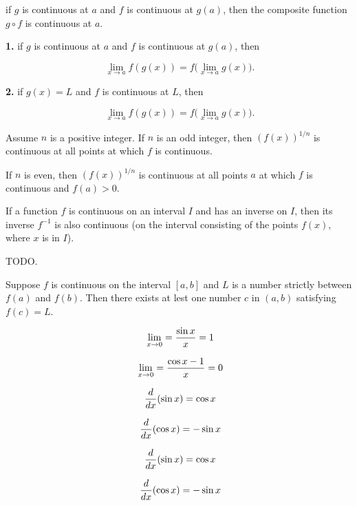 \endthm

if $g$ is continuous at $a$ and $f$ is continuous at $g(a)$,
then the composite function $g \circ f$ is continuous at $a$.
\endthm

\par {\bf 1.} if $g$ is continuous at $a$ and $f$ is continuous
at $g(a)$, then

$$\
\lim_{x \to a} f(g(x)) = f\big(\lim_{x \to a} g(x)\big).
$$

\par {\bf 2.} if $g(x) = L$ and $f$ is continuous at $L$,
then

$$\
\lim_{x \to a} f(g(x)) = f\big(\lim_{x \to a} g(x)\big).
$$

\endthm

Assume $n$ is a positive integer. If $n$ is an odd integer,
then $(f(x))^{1/n}$ is continuous at all points at which
$f$ is continuous.
\par
If $n$ is even, then $(f(x))^{1/n}$ is continuous at all points
$a$ at which $f$ is continuous and $f(a) > 0$.
\endthm

If a function $f$ is continuous on an interval $I$ and
has an inverse on $I$, then its inverse $f^{-1}$ is also
continuous (on the interval consisting of the points
$f(x)$, where $x$ is in $I$).
\endthm

TODO.
\endthm

Suppose $f$ is continuous on the interval $[a, b]$ and $L$
is a number strictly between $f(a)$ and $f(b)$. Then there
exists at lest one number $c$ in $(a, b)$ satisfying $f(c) = L$.
\endthm

$$\
\lim_{x \to 0} = {\sin x \over x} = 1
$$

$$\
\lim_{x \to 0} = {\cos x - 1 \over x} = 0
$$
\endthm

$$\
{d \over dx}(\sin x) = \cos x
$$

$$\
{d \over dx}(\cos x) = -\sin x
$$
\endthm

$$\
{d \over dx}
(\sin x)
=
\cos x
$$

$$\
{d \over dx}
(\cos x)
=
-\sin x
$$

